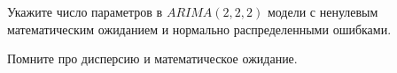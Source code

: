 
\begin{question}
Укажите число параметров в \(ARIMA(2, 2, 2)\) модели с ненулевым математическим ожиданием и нормально распределенными ошибками.
\end{question}

\begin{solution}
Помните про дисперсию и математическое ожидание.
\end{solution}

